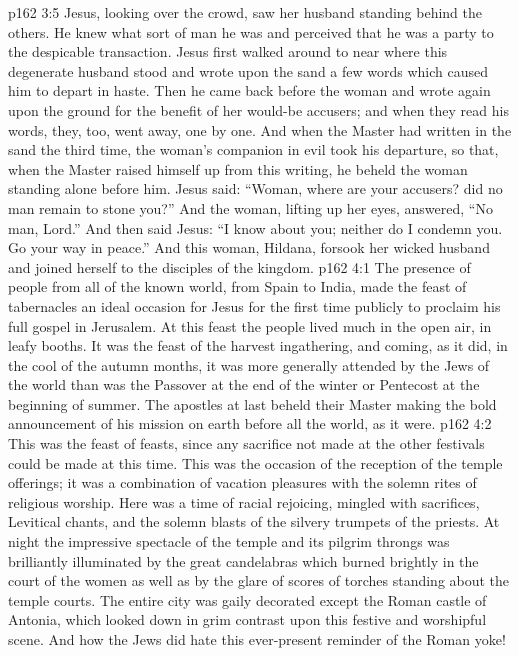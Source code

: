 \vs p162 3:5 Jesus, looking over the crowd, saw her husband standing behind the others. He knew what sort of man he was and perceived that he was a party to the despicable transaction. Jesus first walked around to near where this degenerate husband stood and wrote upon the sand a few words which caused him to depart in haste. Then he came back before the woman and wrote again upon the ground for the benefit of her would\hyp{}be accusers; and when they read his words, they, too, went away, one by one. And when the Master had written in the sand the third time, the woman’s companion in evil took his departure, so that, when the Master raised himself up from this writing, he beheld the woman standing alone before him. Jesus said: \textcolor{ubdarkred}{“Woman, where are your accusers? did no man remain to stone you?”} And the woman, lifting up her eyes, answered, “No man, Lord.” And then said Jesus: \textcolor{ubdarkred}{“I know about you; neither do I condemn you. Go your way in peace.”} And this woman, Hildana, forsook her wicked husband and joined herself to the disciples of the kingdom.
\vs p162 4:1 The presence of people from all of the known world, from Spain to India, made the feast of tabernacles an ideal occasion for Jesus for the first time publicly to proclaim his full gospel in Jerusalem. At this feast the people lived much in the open air, in leafy booths. It was the feast of the harvest ingathering, and coming, as it did, in the cool of the autumn months, it was more generally attended by the Jews of the world than was the Passover at the end of the winter or Pentecost at the beginning of summer. The apostles at last beheld their Master making the bold announcement of his mission on earth before all the world, as it were.
\vs p162 4:2 This was the feast of feasts, since any sacrifice not made at the other festivals could be made at this time. This was the occasion of the reception of the temple offerings; it was a combination of vacation pleasures with the solemn rites of religious worship. Here was a time of racial rejoicing, mingled with sacrifices, Levitical chants, and the solemn blasts of the silvery trumpets of the priests. At night the impressive spectacle of the temple and its pilgrim throngs was brilliantly illuminated by the great candelabras which burned brightly in the court of the women as well as by the glare of scores of torches standing about the temple courts. The entire city was gaily decorated except the Roman castle of Antonia, which looked down in grim contrast upon this festive and worshipful scene. And how the Jews did hate this ever\hyp{}present reminder of the Roman yoke!
